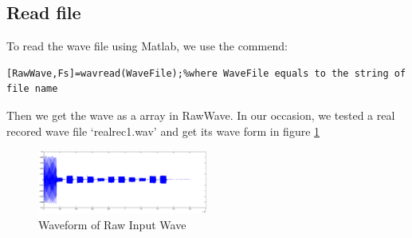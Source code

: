 \documentclass[journal]{./sty/IEEEtran}
\let\MYoriglatexcaption\caption
\renewcommand{\caption}[2][\relax]{\MYoriglatexcaption[#2]{#2}}
\begin{document}
\subsection{Read file}
To read the wave file using Matlab, we use the commend:
\begin{lstlisting}
[RawWave,Fs]=wavread(WaveFile);%where WaveFile equals to the string of file name
\end{lstlisting}
Then we get the wave as a array in RawWave. In our occasion, we tested a real recored wave file `realrec1.wav' and get its wave form in figure \ref{fig:rwf} 
 \begin{figure}[!t]
\centering
\includegraphics[width=0.5\textwidth]{./pic/RawWave.eps}
\caption{Waveform of Raw Input Wave}\label{fig:rwf}
\end{figure}
\end{document}
